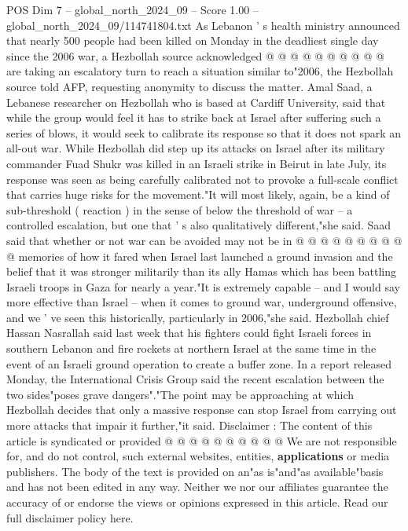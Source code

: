 \begin{textsample}{POS Dim 7 – global\_north\_2024\_09 – Score 1.00 – global\_north\_2024\_09/114741804.txt}
As Lebanon ' s health ministry announced that nearly 500 people had been killed on Monday in the deadliest single day since the 2006 war, a Hezbollah source acknowledged @ @ @ @ @ @ @ @ @ @ are taking an escalatory turn to reach a situation similar to"2006, the Hezbollah source told AFP, requesting anonymity to discuss the matter.
Amal Saad, a Lebanese researcher on Hezbollah who is based at Cardiff University, said that while the group would feel it has to strike back at Israel after suffering such a series of blows, it would seek to calibrate its response so that it does not spark an all-out war.
While Hezbollah did step up its attacks on Israel after its military commander Fuad Shukr was killed in an Israeli strike in Beirut in late July, its response was seen as being carefully calibrated not to provoke a full-scale conflict that carries huge risks for the movement."It will most likely, again, be a kind of sub-threshold ( reaction ) in the sense of below the threshold of war -- a controlled escalation, but one that ' s also qualitatively different,"she said.
Saad said that whether or not war can be avoided may not be in @ @ @ @ @ @ @ @ @ @ memories of how it fared when Israel last launched a ground invasion and the belief that it was stronger militarily than its ally Hamas which has been battling Israeli troops in Gaza for nearly a year."It is extremely capable -- and I would say more effective than Israel -- when it comes to ground war, underground offensive, and we ' ve seen this historically, particularly in 2006,"she said.
Hezbollah chief Hassan Nasrallah said last week that his fighters could fight Israeli forces in southern Lebanon and fire rockets at northern Israel at the same time in the event of an Israeli ground operation to create a buffer zone.
In a report released Monday, the International Crisis Group said the recent escalation between the two sides"poses grave dangers"."The point may be approaching at which Hezbollah decides that only a massive response can stop Israel from carrying out more attacks that impair it further,"it said.
Disclaimer : The content of this article is syndicated or provided @ @ @ @ @ @ @ @ @ @ We are not responsible for, and do not control, such external websites, entities, \textbf{applications} or media publishers.
The body of the text is provided on an"as is"and"as available"basis and has not been edited in any way.
Neither we nor our affiliates guarantee the accuracy of or endorse the views or opinions expressed in this article.
Read our full disclaimer policy here.

\end{textsample}
